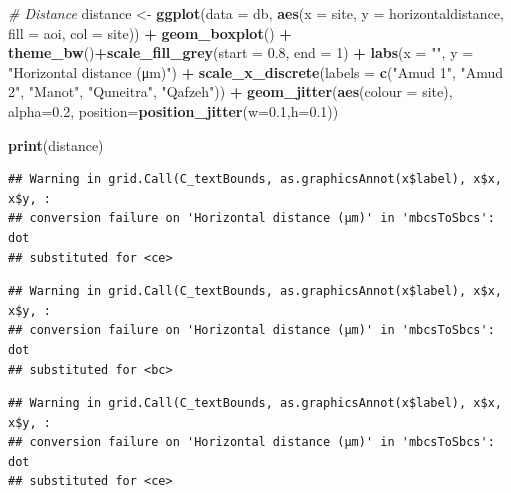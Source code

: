 \documentclass[
]{article}
\newenvironment{Shaded}{\begin{snugshade}}{\end{snugshade}}
\newcommand{\AttributeTok}[1]{\textcolor[rgb]{0.13,0.29,0.53}{#1}}
\newcommand{\CommentTok}[1]{\textcolor[rgb]{0.56,0.35,0.01}{\textit{#1}}}
\newcommand{\DecValTok}[1]{\textcolor[rgb]{0.00,0.00,0.81}{#1}}
\newcommand{\FloatTok}[1]{\textcolor[rgb]{0.00,0.00,0.81}{#1}}
\newcommand{\FunctionTok}[1]{\textcolor[rgb]{0.13,0.29,0.53}{\textbf{#1}}}
\newcommand{\NormalTok}[1]{#1}
\newcommand{\OtherTok}[1]{\textcolor[rgb]{0.56,0.35,0.01}{#1}}
\newcommand{\SpecialCharTok}[1]{\textcolor[rgb]{0.81,0.36,0.00}{\textbf{#1}}}
\newcommand{\StringTok}[1]{\textcolor[rgb]{0.31,0.60,0.02}{#1}}
\begin{document}
\begin{Shaded}
\begin{Highlighting}[]
\CommentTok{\# Distance}
\NormalTok{distance }\OtherTok{\textless{}{-}} \FunctionTok{ggplot}\NormalTok{(}\AttributeTok{data =}\NormalTok{ db, }\FunctionTok{aes}\NormalTok{(}\AttributeTok{x =}\NormalTok{ site, }\AttributeTok{y =}\NormalTok{ horizontaldistance, }\AttributeTok{fill =}\NormalTok{ aoi, }\AttributeTok{col =}\NormalTok{ site)) }\SpecialCharTok{+}  
           \FunctionTok{geom\_boxplot}\NormalTok{() }\SpecialCharTok{+}
           \FunctionTok{theme\_bw}\NormalTok{()}\SpecialCharTok{+}\FunctionTok{scale\_fill\_grey}\NormalTok{(}\AttributeTok{start =} \FloatTok{0.8}\NormalTok{, }\AttributeTok{end =} \DecValTok{1}\NormalTok{) }\SpecialCharTok{+}
           \FunctionTok{labs}\NormalTok{(}\AttributeTok{x =} \StringTok{""}\NormalTok{, }\AttributeTok{y =} \StringTok{"Horizontal distance (μm)"}\NormalTok{) }\SpecialCharTok{+}
           \FunctionTok{scale\_x\_discrete}\NormalTok{(}\AttributeTok{labels =} \FunctionTok{c}\NormalTok{(}\StringTok{"Amud 1"}\NormalTok{, }\StringTok{"Amud 2"}\NormalTok{, }\StringTok{"Manot"}\NormalTok{, }\StringTok{"Quneitra"}\NormalTok{, }\StringTok{"Qafzeh"}\NormalTok{)) }\SpecialCharTok{+}
           \FunctionTok{geom\_jitter}\NormalTok{(}\FunctionTok{aes}\NormalTok{(}\AttributeTok{colour =}\NormalTok{ site), }\AttributeTok{alpha=}\FloatTok{0.2}\NormalTok{, }\AttributeTok{position=}\FunctionTok{position\_jitter}\NormalTok{(}\AttributeTok{w=}\FloatTok{0.1}\NormalTok{,}\AttributeTok{h=}\FloatTok{0.1}\NormalTok{))}

\FunctionTok{print}\NormalTok{(distance)}
\end{Highlighting}
\end{Shaded}

\begin{verbatim}
## Warning in grid.Call(C_textBounds, as.graphicsAnnot(x$label), x$x, x$y, :
## conversion failure on 'Horizontal distance (μm)' in 'mbcsToSbcs': dot
## substituted for <ce>
\end{verbatim}

\begin{verbatim}
## Warning in grid.Call(C_textBounds, as.graphicsAnnot(x$label), x$x, x$y, :
## conversion failure on 'Horizontal distance (μm)' in 'mbcsToSbcs': dot
## substituted for <bc>
\end{verbatim}

\begin{verbatim}
## Warning in grid.Call(C_textBounds, as.graphicsAnnot(x$label), x$x, x$y, :
## conversion failure on 'Horizontal distance (μm)' in 'mbcsToSbcs': dot
## substituted for <ce>
\end{verbatim}
\end{document}
